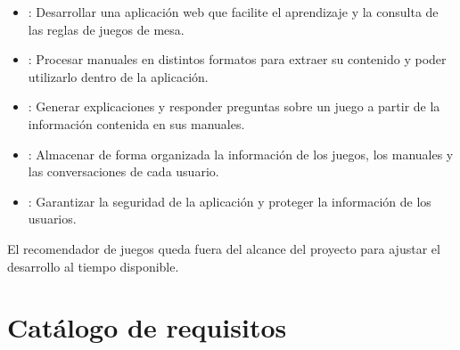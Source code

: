 \begin{itemize}
    \item \textbf{}: Desarrollar una aplicación web que facilite el
    aprendizaje y la consulta de las reglas de juegos de mesa.

    \item \textbf{}: Procesar manuales en distintos formatos para extraer
    su contenido y poder utilizarlo dentro de la aplicación.

    \item \textbf{}: Generar explicaciones y responder preguntas sobre un
    juego a partir de la información contenida en sus manuales.

    \item \textbf{}: Almacenar de forma organizada la información de los
    juegos, los manuales y las conversaciones de cada usuario.

    \item \textbf{}: Garantizar la seguridad de la
    aplicación y proteger la información de los usuarios.
\end{itemize}

El recomendador de juegos queda fuera del alcance del proyecto para ajustar
el desarrollo al tiempo disponible.

\section{Catálogo de requisitos}

\newcommand{\idRequisito}[1]{%
    \hypertarget{req:#1}{#1}%
}

\newcommand{\refRequisito}[1]{%
    \hyperlink{req:#1}{#1}%
}

\newcommand{\subrequisito}[3]{%
    \par\smallskip
    \textbf{\idRequisito{#1}. #2}: #3%
}

\newcommand{\fichaRequisito}[9]{%
    \begin{table}[H]
    \centering
    \begin{tblr}{
        width=\linewidth,
        colspec={Q[l,wd=0.26\linewidth] X[l]},
        rows={valign=t},
        row{1}={bg=gray!18,font=\bfseries},
        column{1}={font=\bfseries},
        hline{1}={0.8pt},
        hline{2}={0.5pt},
        hline{Z}={0.8pt},
        leftsep=4pt,
        rightsep=4pt,
        rowsep=2pt
    }
        \idRequisito{#1} & #2 \\
        Objetivo general & #3 \\
        #4 & #5 \\
        Descripción & #6 \\
        Prioridad & #7 \\
        Relacionado con & #8 \\
        #9%
    \end{tblr}
    \caption{\textbf{#1}. #2.}
    \label{tab:req:#1}
    \end{table}
}

